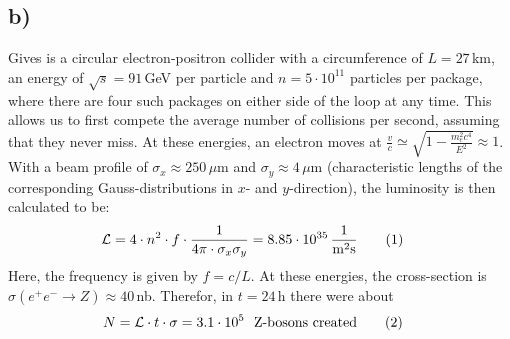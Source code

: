 \documentclass[a4paper,12pt]{article}
\newcommand\numberthis{\addtocounter{equation}{1}\tag{\theequation}}
\newcommand{\tecxt}{}
\begin{document}
\subsection*{b)}Gives is a circular electron-positron collider with a circumference of $L=27$\,km, an energy of $\sqrt{s}=91$\,GeV per particle and $n=5\cdot 10^{11}$ particles per package, where there are four such packages on either side of the loop at any time. This allows us to first compete the average number of collisions per second, assuming that they never miss. At these energies, an electron moves at $\frac{v}{c}\simeq\sqrt{1-\frac{m_e^2c^4}{E^2}}\approx 1$. With a beam profile of $\sigma_x\approx 250\,\mu$m and $\sigma_y\approx 4\,\mu$m (characteristic lengths of the corresponding Gauss-distributions in $x$- and $y$-direction), the luminosity is then calculated to be:
\begin{align*}
\mathcal{L}&=4\cdot n^2\cdot f\cdot\frac{1}{4\pi\cdot\sigma_x\sigma_y}=8.85\cdot 10^{35}\,\frac{1}{\tecxt\text{m}^2\tecxt\text{s}}\numberthis\label{Collisons per second at LEP}
\end{align*}
Here, the frequency is given by $f=c/L$. At these energies, the cross-section is $\sigma(e^+e^-\rightarrow Z)\approx 40\,$nb. Therefor, in $t=24\,$h there were about
\begin{align*}
N&=\mathcal{L}\cdot t\cdot\sigma=3.1\cdot 10^5\ \ \tecxt\text{Z-bosons created}\numberthis\label{Z bosons at LEP per day}
\end{align*}
\end{document}

